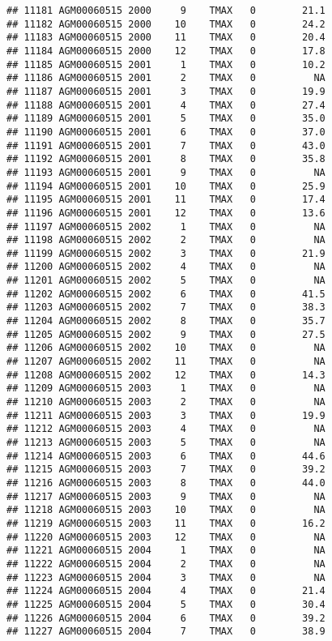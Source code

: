 \documentclass{article}\usepackage[]{graphicx}\usepackage[]{color}
\makeatletter
\newenvironment{kframe}{%
 \def\at@end@of@kframe{}%
 \ifinner\ifhmode%
  \def\at@end@of@kframe{\end{minipage}}%
  \begin{minipage}{\columnwidth}%
 \fi\fi%
 \def\FrameCommand##1{\hskip\@totalleftmargin \hskip-\fboxsep
 \colorbox{shadecolor}{##1}\hskip-\fboxsep
     \hskip-\linewidth \hskip-\@totalleftmargin \hskip\columnwidth}%
 \MakeFramed {\advance\hsize-\width
   \@totalleftmargin\z@ \linewidth\hsize
   \@setminipage}}%
 {\par\unskip\endMakeFramed%
 \at@end@of@kframe}
\newenvironment{knitrout}{}{} %
\makeatother
\begin{document}
\begin{knitrout}
\begin{kframe}
\begin{verbatim}
## 11181 AGM00060515 2000     9    TMAX   0        21.1
## 11182 AGM00060515 2000    10    TMAX   0        24.2
## 11183 AGM00060515 2000    11    TMAX   0        20.4
## 11184 AGM00060515 2000    12    TMAX   0        17.8
## 11185 AGM00060515 2001     1    TMAX   0        10.2
## 11186 AGM00060515 2001     2    TMAX   0          NA
## 11187 AGM00060515 2001     3    TMAX   0        19.9
## 11188 AGM00060515 2001     4    TMAX   0        27.4
## 11189 AGM00060515 2001     5    TMAX   0        35.0
## 11190 AGM00060515 2001     6    TMAX   0        37.0
## 11191 AGM00060515 2001     7    TMAX   0        43.0
## 11192 AGM00060515 2001     8    TMAX   0        35.8
## 11193 AGM00060515 2001     9    TMAX   0          NA
## 11194 AGM00060515 2001    10    TMAX   0        25.9
## 11195 AGM00060515 2001    11    TMAX   0        17.4
## 11196 AGM00060515 2001    12    TMAX   0        13.6
## 11197 AGM00060515 2002     1    TMAX   0          NA
## 11198 AGM00060515 2002     2    TMAX   0          NA
## 11199 AGM00060515 2002     3    TMAX   0        21.9
## 11200 AGM00060515 2002     4    TMAX   0          NA
## 11201 AGM00060515 2002     5    TMAX   0          NA
## 11202 AGM00060515 2002     6    TMAX   0        41.5
## 11203 AGM00060515 2002     7    TMAX   0        38.3
## 11204 AGM00060515 2002     8    TMAX   0        35.7
## 11205 AGM00060515 2002     9    TMAX   0        27.5
## 11206 AGM00060515 2002    10    TMAX   0          NA
## 11207 AGM00060515 2002    11    TMAX   0          NA
## 11208 AGM00060515 2002    12    TMAX   0        14.3
## 11209 AGM00060515 2003     1    TMAX   0          NA
## 11210 AGM00060515 2003     2    TMAX   0          NA
## 11211 AGM00060515 2003     3    TMAX   0        19.9
## 11212 AGM00060515 2003     4    TMAX   0          NA
## 11213 AGM00060515 2003     5    TMAX   0          NA
## 11214 AGM00060515 2003     6    TMAX   0        44.6
## 11215 AGM00060515 2003     7    TMAX   0        39.2
## 11216 AGM00060515 2003     8    TMAX   0        44.0
## 11217 AGM00060515 2003     9    TMAX   0          NA
## 11218 AGM00060515 2003    10    TMAX   0          NA
## 11219 AGM00060515 2003    11    TMAX   0        16.2
## 11220 AGM00060515 2003    12    TMAX   0          NA
## 11221 AGM00060515 2004     1    TMAX   0          NA
## 11222 AGM00060515 2004     2    TMAX   0          NA
## 11223 AGM00060515 2004     3    TMAX   0          NA
## 11224 AGM00060515 2004     4    TMAX   0        21.4
## 11225 AGM00060515 2004     5    TMAX   0        30.4
## 11226 AGM00060515 2004     6    TMAX   0        39.2
## 11227 AGM00060515 2004     7    TMAX   0        38.9

\end{verbatim}
\end{kframe}
\end{knitrout}
\end{document}
